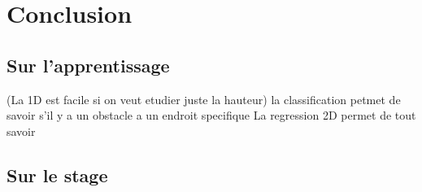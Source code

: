 \documentclass{beamer}
\begin{document}


\section{Conclusion}

\label{Section5}

\subsection{Sur l'apprentissage}
(La 1D est facile si on veut etudier juste la hauteur)
la classification petmet de savoir s'il y a un obstacle a un endroit specifique
La regression 2D permet de tout savoir

\subsection{Sur le stage}
\end{document}
